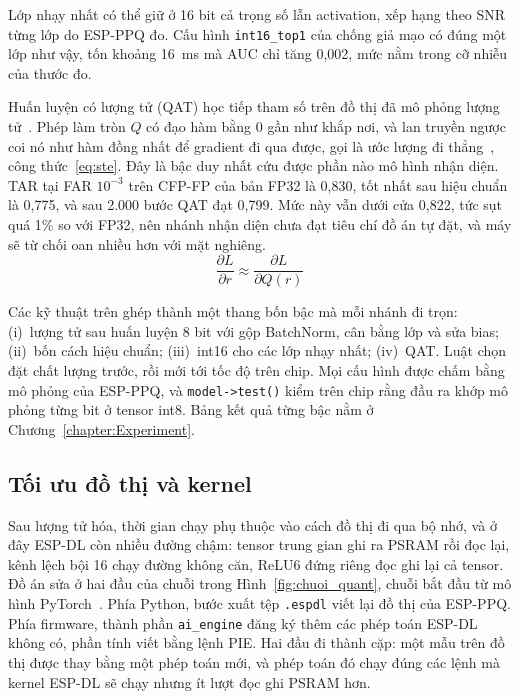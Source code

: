 \documentclass[../DoAn.tex]{subfiles}
\begin{document}
Lớp nhạy nhất có thể giữ ở 16 bit cả trọng số lẫn activation, xếp hạng theo SNR
từng lớp do ESP-PPQ đo. Cấu hình \texttt{int16\_top1} của chống giả mạo có đúng một
lớp như vậy, tốn khoảng 16~ms mà AUC chỉ tăng 0,002, mức nằm trong cỡ nhiễu của
thước đo.

Huấn luyện có lượng tử (QAT) học tiếp tham số trên đồ thị đã mô phỏng lượng
tử~\cite{jacob2018}. Phép làm tròn $Q$ có đạo hàm bằng 0 gần như khắp nơi, và lan truyền ngược coi nó như hàm đồng nhất để gradient đi qua được, gọi là ước lượng đi
thẳng~\cite{bengio2013}, công thức~\eqref{eq:ste}. Đây là bậc duy nhất cứu được
phần nào mô hình nhận diện. TAR tại FAR $10^{-3}$ trên CFP-FP của bản FP32 là
0,830, tốt nhất sau hiệu chuẩn là 0,775, và sau 2.000 bước QAT đạt 0,799. Mức này
vẫn dưới cửa 0,822, tức sụt quá 1\% so với FP32, nên nhánh nhận diện chưa đạt tiêu
chí đồ án tự đặt, và máy sẽ từ chối oan nhiều hơn với mặt nghiêng.
\begin{equation}
\frac{\partial L}{\partial r} \approx \frac{\partial L}{\partial Q(r)}
\label{eq:ste}
\end{equation}

Các kỹ thuật trên ghép thành một thang bốn bậc mà mỗi nhánh đi trọn: (i)~lượng tử
sau huấn luyện 8 bit với gộp BatchNorm, cân bằng lớp và sửa bias; (ii)~bốn cách
hiệu chuẩn; (iii)~int16 cho các lớp nhạy nhất; (iv)~QAT. Luật chọn đặt chất lượng
trước, rồi mới tới tốc độ trên chip. Mọi cấu hình được chấm bằng mô phỏng của
ESP-PPQ, và \texttt{model->test()} kiểm trên chip rằng đầu ra khớp mô phỏng từng
bit ở tensor int8. Bảng kết quả từng bậc nằm ở Chương~\ref{chapter:Experiment}.

\subsection{Tối ưu đồ thị và kernel}
\label{section:2.4.3}

Sau lượng tử hóa, thời gian chạy phụ thuộc vào cách đồ thị đi qua bộ nhớ, và ở đây
ESP-DL còn nhiều đường chậm: tensor trung gian ghi ra PSRAM rồi đọc lại, kênh lệch
bội 16 chạy đường không căn, ReLU6 đứng riêng đọc ghi lại cả tensor. Đồ án sửa ở
hai đầu của chuỗi trong Hình~\ref{fig:chuoi_quant}, chuỗi bắt đầu từ mô hình
PyTorch~\cite{pytorch}. Phía Python, bước xuất tệp \texttt{.espdl} viết lại đồ thị
của ESP-PPQ. Phía firmware, thành phần
\texttt{ai\_engine} đăng ký thêm các phép toán ESP-DL không có, phần tính viết bằng
lệnh PIE. Hai đầu đi thành cặp: một mẫu trên đồ thị được thay bằng một phép toán
mới, và phép toán đó chạy đúng các lệnh mà kernel ESP-DL sẽ chạy nhưng ít lượt đọc
ghi PSRAM hơn.
\end{document}
